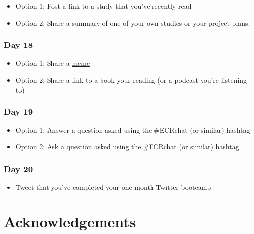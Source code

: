 \documentclass[
]{book}
\providecommand{\tightlist}{%
  \setlength{\itemsep}{0pt}\setlength{\parskip}{0pt}}
\begin{document}
\begin{itemize}
\tightlist
\item
  Option 1: Post a link to a study that you've recently read
\item
  Option 2: Share a summary of one of your own studies or your project plans.
\end{itemize}

\hypertarget{day-18}{%
\subsection*{Day 18}\label{day-18}}

\begin{itemize}
\tightlist
\item
  Option 1: Share a \protect\hyperlink{composing}{meme}
\item
  Option 2: Share a link to a book your reading (or a podcast you're listening to)
\end{itemize}

\hypertarget{day-19}{%
\subsection*{Day 19}\label{day-19}}

\begin{itemize}
\tightlist
\item
  Option 1: Answer a question asked using the \#ECRchat (or similar) hashtag
\item
  Option 2: Ask a question asked using the \#ECRchat (or similar) hashtag
\end{itemize}

\hypertarget{day-20}{%
\subsection*{Day 20}\label{day-20}}

\begin{itemize}
\tightlist
\item
  Tweet that you've completed your one-month Twitter bootcamp
\end{itemize}

\hypertarget{acknowledgements}{%
\chapter{Acknowledgements}\label{acknowledgements}}
\end{document}
